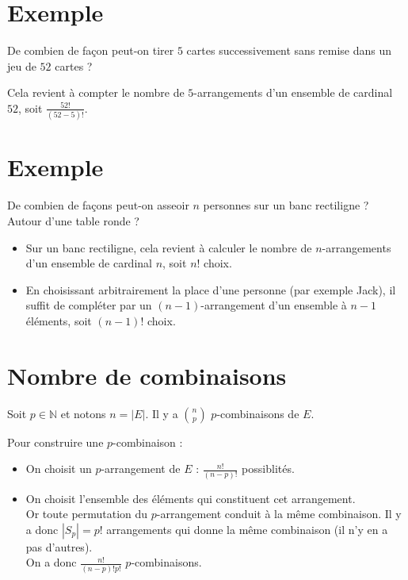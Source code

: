\documentclass[../main.tex]{subfiles}
\begin{document}
\section{Exemple}
\begin{tcolorbox}[title=Exemple 31.32, title filled=false, colframe=darkgreen, colback=darkgreen!10!white]
    De combien de façon peut-on tirer $5$ cartes successivement sans remise dans un jeu de $52$ cartes ?
\end{tcolorbox}

\noindent Cela revient à compter le nombre de $5$-arrangements d'un ensemble de cardinal $52$, soit $\frac{52!}{(52-5)!}$. 

\section{Exemple}
\begin{tcolorbox}[title=Exemple 31.33, title filled=false, colframe=darkgreen, colback=darkgreen!10!white]
    De combien de façons peut-on asseoir $n$ personnes sur un banc rectiligne ? Autour d'une table ronde ?
\end{tcolorbox}

\begin{itemize}
    \item Sur un banc rectiligne, cela revient à calculer le nombre de $n$-arrangements d'un ensemble de cardinal $n$, soit $n!$ choix.
    \item En choisissant arbitrairement la place d'une personne (par exemple Jack), il suffit de compléter par un $(n-1)$-arrangement d'un ensemble à $n-1$ éléments, soit $(n-1)!$ choix. 
\end{itemize}

\section{Nombre de combinaisons}
\begin{tcolorbox}[title=Propostion 31.38, title filled=false, colframe=lightblue, colback=lightblue!10!white]
    Soit $p\in \mathbb{N}$ et notons $n = |E|$. Il y a $\binom{n}{p}$ $p$-combinaisons de $E$.
\end{tcolorbox}

\noindent Pour construire une $p$-combinaison : 
\begin{itemize}
    \item On choisit un $p$-arrangement de $E$ : $\frac{n!}{(n-p)!}$ possiblités. 
    \item On choisit l'ensemble des éléments qui constituent cet arrangement. \\
    Or toute permutation du $p$-arrangement conduit à la même combinaison. Il y a donc $|S_p| = p!$ arrangements qui donne la même combinaison (il n'y en a pas d'autres). \\
    On a donc $\frac{n!}{(n-p)!p!}$ $p$-combinaisons. 
\end{itemize}
\end{document}
